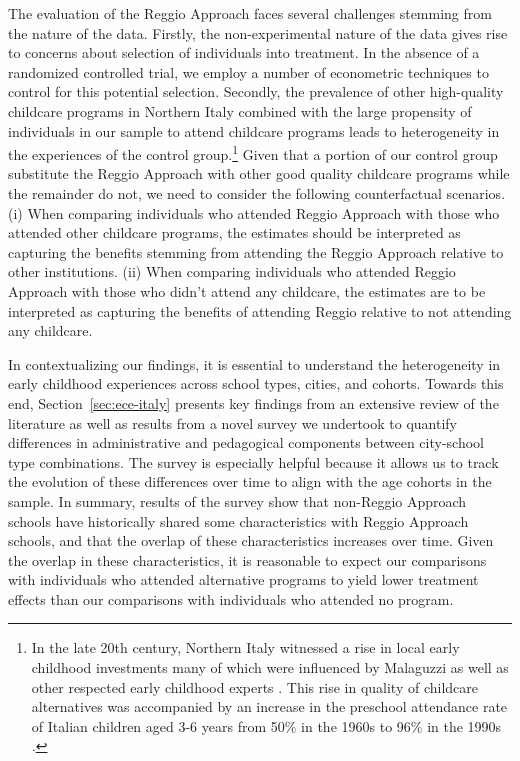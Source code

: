 The evaluation of the Reggio Approach faces several challenges stemming from the nature of the data. Firstly, the non-experimental nature of the data gives rise to concerns about selection of individuals into treatment. In the absence of a randomized controlled trial, we employ a number of econometric techniques to control for this potential selection. Secondly, the prevalence of other high-quality childcare programs in Northern Italy combined with the large propensity of individuals in our sample to attend childcare programs leads to heterogeneity in the experiences of the control group.\footnote{In the late 20th century, Northern Italy witnessed a rise in local early childhood investments many of which were influenced by Malaguzzi as well as other respected early childhood experts \citep{OECD_2001_Italy-Country-Note}. This rise in quality of childcare alternatives was accompanied by an increase in the preschool attendance rate of Italian children aged 3-6 years from 50\% in the 1960s to 96\% in the 1990s \citep{Hohnerlein_2015_Development-and-Diffusion}.} Given that a portion of our control group substitute the Reggio Approach with other good quality childcare programs while the remainder do not, we need to consider the following counterfactual scenarios. (i) When comparing individuals who attended Reggio Approach with those who attended other childcare programs, the estimates should be interpreted as capturing the benefits stemming from attending the Reggio Approach relative to other institutions. (ii) When comparing individuals who attended Reggio Approach with those who didn't attend any childcare, the estimates are to be interpreted as capturing the benefits of attending Reggio relative to not attending any childcare.

In contextualizing our findings, it is essential to understand the heterogeneity in early childhood experiences across school types, cities, and cohorts. Towards this end, Section~\ref{sec:ece-italy} presents key findings from an extensive review of the literature as well as results from a novel survey we undertook to quantify differences in administrative and pedagogical components between city-school type combinations. The survey is especially helpful because it allows us to track the evolution of these differences over time to align with the age cohorts in the sample. In summary, results of the survey show that non-Reggio Approach schools have historically shared some characteristics with Reggio Approach schools, and that the overlap of these characteristics increases over time. Given the overlap in these characteristics, it is reasonable to expect our comparisons with individuals who attended alternative programs to yield lower treatment effects than our comparisons with individuals who attended no program.

